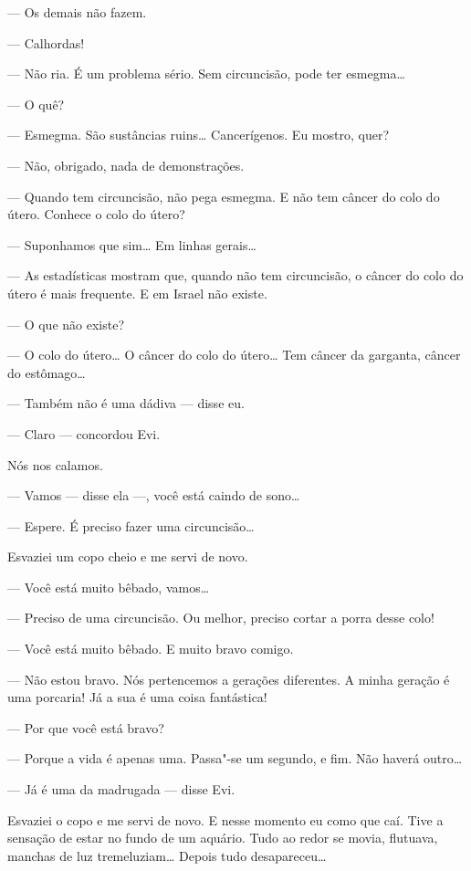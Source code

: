 --- Os demais não fazem.

--- Calhordas!

--- Não ria. É um problema sério. Sem circuncisão, pode ter
esmegma\ldots{}

--- O quê?

--- Esmegma. São sustâncias ruins\ldots{} Cancerígenos. Eu mostro,
quer?

--- Não, obrigado, nada de demonstrações.

--- Quando tem circuncisão, não pega esmegma. E não tem câncer do
colo do útero. Conhece o colo do útero?

--- Suponhamos que sim\ldots{} Em linhas gerais\ldots{}

--- As estadísticas mostram que, quando não tem circuncisão, o
câncer do colo do útero é mais frequente. E em Israel não existe.

--- O que não existe?

--- O colo do útero\ldots{} O câncer do colo do útero\ldots{} Tem câncer da
garganta, câncer do estômago\ldots{}

--- Também não é uma dádiva --- disse eu.

--- Claro --- concordou Evi.

Nós nos calamos.

--- Vamos --- disse ela ---, você está caindo de
sono\ldots{}

--- Espere. É preciso fazer uma circuncisão\ldots{}

Esvaziei um copo cheio e me servi de novo.

--- Você está muito bêbado, vamos\ldots{}

--- Preciso de uma circuncisão. Ou melhor, preciso cortar a porra
desse colo!

--- Você está muito bêbado. E muito bravo comigo.

--- Não estou bravo. Nós pertencemos a gerações diferentes. A
minha geração é uma porcaria! Já a sua é uma coisa fantástica!

--- Por que você está bravo?

--- Porque a vida é apenas uma. Passa"-se um segundo, e fim. Não
haverá outro\ldots{}

--- Já é uma da madrugada --- disse Evi.

Esvaziei o copo e me servi de novo. E nesse momento eu como que caí.
Tive a sensação de estar no fundo de um aquário. Tudo ao redor se movia,
flutuava, manchas de luz tremeluziam\ldots{} Depois tudo desapareceu\ldots{}

